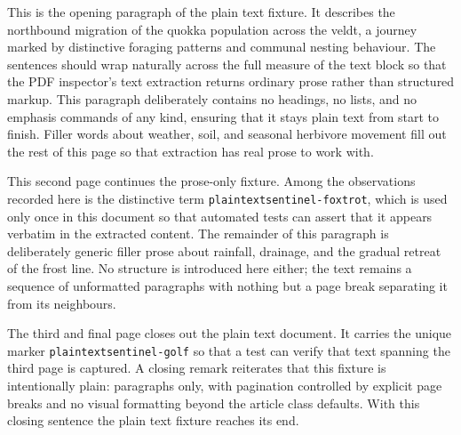 \documentclass{article}
\begin{document}
This is the opening paragraph of the plain text fixture. It describes the
northbound migration of the quokka population across the veldt, a journey
marked by distinctive foraging patterns and communal nesting behaviour. The
sentences should wrap naturally across the full measure of the text block so
that the PDF inspector's text extraction returns ordinary prose rather than
structured markup. This paragraph deliberately contains no headings, no lists,
and no emphasis commands of any kind, ensuring that it stays plain text from
start to finish. Filler words about weather, soil, and seasonal herbivore
movement fill out the rest of this page so that extraction has real prose to
work with.

\newpage

This second page continues the prose-only fixture. Among the observations
recorded here is the distinctive term \texttt{plaintextsentinel-foxtrot},
which is used only once in this document so that automated tests can assert
that it appears verbatim in the extracted content. The remainder of this
paragraph is deliberately generic filler prose about rainfall, drainage, and
the gradual retreat of the frost line. No structure is introduced here either;
the text remains a sequence of unformatted paragraphs with nothing but a page
break separating it from its neighbours.

\newpage

The third and final page closes out the plain text document. It carries the
unique marker \texttt{plaintextsentinel-golf} so that a test can verify that
text spanning the third page is captured. A closing remark reiterates that
this fixture is intentionally plain: paragraphs only, with pagination
controlled by explicit page breaks and no visual formatting beyond the
article class defaults. With this closing sentence the plain text fixture
reaches its end.
\end{document}
